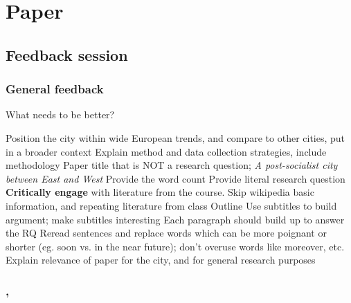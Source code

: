 \documentclass{article}
\begin{document}
\section{Paper}

\subsection{Feedback session}
\date{December 13th, 2021}

\subsubsection{General feedback}

What needs to be better? 

\begin{outline}
	\1 Position the city within wide European trends, and compare to other cities, put in a broader context
	\1 Explain method and data collection strategies, include methodology
	\1 Paper title that is NOT a research question; \textit{A post-socialist city between East and West}
	\1 Provide the word count
	\1 Provide literal research question
	\1 \textbf{Critically engage} with literature from the course. Skip wikipedia basic information, and repeating literature from class
	\1 Outline
		\2 Use subtitles to build argument; make subtitles interesting
		\2 Each paragraph should build up to answer the RQ
	\1 Reread sentences and replace words which can be more poignant or shorter (eg. soon vs. in the near future); don't overuse words like moreover, etc.
	\1 Explain relevance of paper for the city, and for general research purposes
\end{outline}



\subsubsection{, \textit{}}

\begin{outline}
	\1
\end{outline}


\fi
\end{document}
